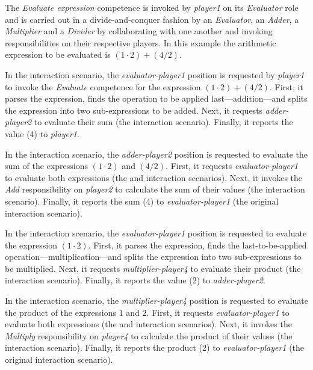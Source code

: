 The \textit{Evaluate expression} competence is invoked by \textit{player1} on its \textit{Evaluator} role and is carried out in a divide-and-conquer fashion by an \textit{Evaluator}, an \textit{Adder}, a \textit{Multiplier} and a \textit{Divider} by collaborating with one another and invoking responsibilities on their respective players.
In this example the arithmetic expression to be evaluated is $(1\cdot2)+(4/2)$.

In the {} interaction scenario, the \textit{evaluator-player1} position is requested by \textit{player1} to invoke the \textit{Evaluate} competence for the expression $(1\cdot2)+(4/2)$.
First, it parses the expression, finds the operation to be applied last---addition---and splits the expression into two sub-expressions to be added.
Next, it requests \textit{adder-player2} to evaluate their sum (the {} interaction scenario).
Finally, it reports the value (4) to \textit{player1}.

In the {} interaction scenario, the \textit{adder-player2} position is requested to evaluate the sum of the expressions $(1\cdot2)$ and $(4/2)$.
First, it requests \textit{evaluator-player1} to evaluate both expressions (the {} and {} interaction scenarios).
Next, it invokes the \textit{Add} responsibility on \textit{player2} to calculate the sum of their values (the {} interaction scenario).
Finally, it reports the sum (4) to \textit{evaluator-player1} (the original {} interaction scenario).

In the {} interaction scenario, the \textit{evaluator-player1} position is requested to evaluate the expression $(1\cdot2)$.
First, it parses the expression, finds the last-to-be-applied operation---multiplication---and splits the expression into two sub-expressions to be multiplied.
Next, it requests \textit{multiplier-player4} to evaluate their product (the {} interaction scenario).
Finally, it reports the value (2) to \textit{adder-player2}.

In the {} interaction scenario, the \textit{multiplier-player4} position is requested to evaluate the product of the expressions $1$ and $2$.
First, it requests \textit{evaluator-player1} to evaluate both expressions (the {} and {} interaction scenarios).
Next, it invokes the \textit{Multiply} responsibility on \textit{player4} to calculate the product of their values (the {} interaction scenario).
Finally, it reports the product (2) to \textit{evaluator-player1} (the original {} interaction scenario).

